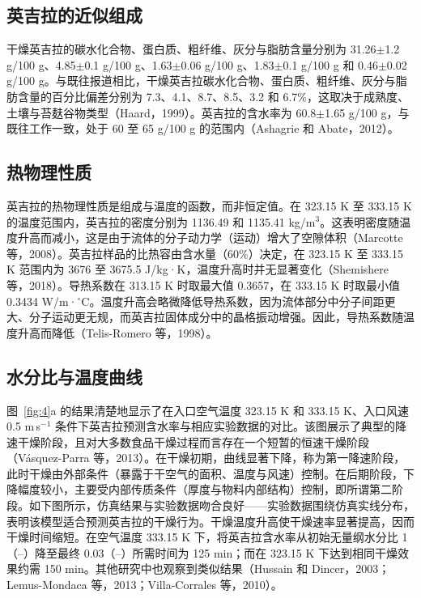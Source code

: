 \documentclass[11pt,a4paper]{ctexart}
\begin{document}
\subsection{英吉拉的近似组成}

干燥英吉拉的碳水化合物、蛋白质、粗纤维、灰分与脂肪含量分别为 31.26$\pm$1.2 g/100 g、4.85$\pm$0.1 g/100 g、1.63$\pm$0.06 g/100 g、1.83$\pm$0.1 g/100 g 和 0.46$\pm$0.02 g/100 g。与既往报道相比，干燥英吉拉碳水化合物、蛋白质、粗纤维、灰分与脂肪含量的百分比偏差分别为 7.3、4.1、8.7、8.5、3.2 和 6.7\%，这取决于成熟度、土壤与苔麸谷物类型（Haard，1999）。英吉拉的含水率为 60.8$\pm$1.65 g/100 g，与既往工作一致，处于 60 至 65 g/100 g 的范围内（Ashagrie 和 Abate，2012）。

\subsection{热物理性质}

英吉拉的热物理性质是组成与温度的函数，而非恒定值。在 323.15 K 至 333.15 K 的温度范围内，英吉拉的密度分别为 1136.49 和 1135.41 kg/m$^3$。这表明密度随温度升高而减小，这是由于流体的分子动力学（运动）增大了空隙体积（Marcotte 等，2008）。英吉拉样品的比热容由含水量（60\%）决定，在 323.15 K 至 333.15 K 范围内为 3676 至 3675.5 J/kg·K，温度升高时并无显著变化（Shemishere 等，2018）。导热系数在 313.15 K 时取最大值 0.3657，在 333.15 K 时取最小值 0.3434 W/m·$^\circ$C。温度升高会略微降低导热系数，因为流体部分中分子间距更大、分子运动更无规，而英吉拉固体成分中的晶格振动增强。因此，导热系数随温度升高而降低（Telis-Romero 等，1998）。

\subsection{水分比与温度曲线}

图~\ref{fig:4}a 的结果清楚地显示了在入口空气温度 323.15 K 和 333.15 K、入口风速 0.5 m\,s$^{-1}$ 条件下英吉拉预测含水率与相应实验数据的对比。该图展示了典型的降速干燥阶段，且对大多数食品干燥过程而言存在一个短暂的恒速干燥阶段（Vásquez-Parra 等，2013）。在干燥初期，曲线显著下降，称为第一降速阶段，此时干燥由外部条件（暴露于干空气的面积、温度与风速）控制。在后期阶段，下降幅度较小，主要受内部传质条件（厚度与物料内部结构）控制，即所谓第二阶段。如下图所示，仿真结果与实验数据吻合良好——实验数据围绕仿真实线分布，表明该模型适合预测英吉拉的干燥行为。干燥温度升高使干燥速率显著提高，因而干燥时间缩短。在空气温度 333.15 K 下，将英吉拉含水率从初始无量纲水分比 1（--）降至最终 0.03（--）所需时间为 125 min；而在 323.15 K 下达到相同干燥效果约需 150 min。其他研究中也观察到类似结果（Hussain 和 Dincer，2003；Lemus-Mondaca 等，2013；Villa-Corrales 等，2010）。
\end{document}
